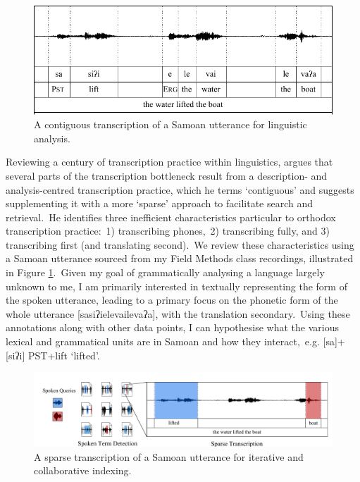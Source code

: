 \documentclass[main.tex]{subfiles}
\begin{document}
\begin{figure}[b]
  \centering
  \includegraphics[width=0.7\linewidth]{figures/intro-conventional-transcription}
  \caption{A contiguous transcription of a Samoan utterance for linguistic analysis.}
\label{fig:how-lift-boat-tf}
\end{figure}

Reviewing a century of transcription practice within linguistics, \textcite{bird-2020-sparse} argues that several parts of the transcription bottleneck result from a description- and analysis-centred transcription practice, which he terms `contiguous' and suggests supplementing it with a more `sparse' approach to facilitate search and retrieval.~He identifies three inefficient characteristics particular to orthodox transcription practice:~1) transcribing phones,~2) transcribing fully, and 3) transcribing first (and translating second).~We review these characteristics using a Samoan utterance sourced from my Field Methods class recordings, illustrated in Figure \ref{fig:how-lift-boat-tf}.~Given my goal of grammatically analysing a language largely unknown to me, I am primarily interested in textually representing the form of the spoken utterance, leading to a primary focus on the phonetic form of the whole utterance [{sasiʔielevailevaʔa}], with the translation secondary.~Using these annotations along with other data points, I can hypothesise what the various lexical and grammatical units are in Samoan and how they interact,~e.g. [{sa}]+[{siʔi}] P{\footnotesize{}ST}+lift `lifted'.

\begin{figure}[t]
  \includegraphics[width=1.0\linewidth]{figures/intro-sparse-transcription}
  \caption{A sparse transcription of a Samoan utterance for iterative and collaborative indexing.}
  \label{fig:how-lift-boat-sparse}
\end{figure}
\end{document}
